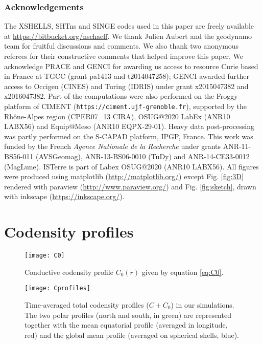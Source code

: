 \documentclass[12pt, a4paper]{article}
\begin{document}
\subsubsection*{Acknowledgements}

{
\footnotesize
The XSHELLS, SHTns and SINGE codes used in this paper are freely available at \url{https://bitbucket.org/nschaeff}.
We thank Julien Aubert and the geodynamo team for fruitful discussions and comments.
We also thank two anonymous referees for their constructive comments that helped improve this paper.
We acknowledge PRACE and GENCI for awarding us access to resource Curie based in France at TGCC (grant pa1413 and t2014047258); GENCI awarded further access to Occigen (CINES) and Turing (IDRIS) under grant x2015047382 and x2016047382.
Part of the computations were also performed on the Froggy platform of CIMENT (\texttt{https://ciment.ujf-grenoble.fr}), supported by the Rh\^ one-Alpes region (CPER07\_13 CIRA), OSUG@2020 LabEx (ANR10 LABX56) and Equip@Meso (ANR10 EQPX-29-01).
Heavy data post-processing was partly performed on the S-CAPAD platform, IPGP, France.
This work was funded by the French {\it Agence Nationale de la Recherche} under grants ANR-11-BS56-011 (AVSGeomag), ANR-13-BS06-0010 (TuDy) and ANR-14-CE33-0012 (MagLune).
ISTerre is part of Labex OSUG@2020 (ANR10 LABX56).
All figures were produced using matplotlib (\url{http://matplotlib.org/}) except Fig. \ref{fig:3D} rendered with paraview (\url{http://www.paraview.org/}) and Fig. \ref{fig:sketch}, drawn with inkscape (\url{https://inkscape.org/}).
}

\appendix

\section{Codensity profiles}	\label{sec:codensity}

\begin{figure}
\begin{center}
\texttt{[image: C0]}
\caption{Conductive codensity profile $C_0(r)$ given by equation \ref{eq:C0}.
}
\label{fig:C0}
\end{center}
\end{figure}

\begin{figure}
\begin{center}
\texttt{[image: Cprofiles]}
\caption{Time-averaged total codensity profiles ($C+C_0$) in our simulations.
The two polar profiles (north and south, in green) are represented together with the mean equatorial profile (averaged in longitude, red) and the global mean profile (averaged on spherical shells, blue).
}
\label{fig:Cprof}
\end{center}
\end{figure}
\end{document}
